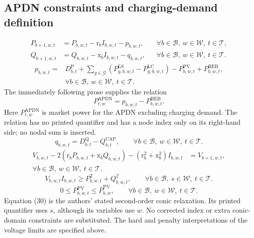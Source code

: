 \documentclass{article}
\begin{document}
\subsection*{APDN constraints and charging-demand definition}
\begin{align}
P_{b+1,w,t}&=P_{b,w,t}-\mathrm r_b I_{b,w,t}-p_{b,w,t},
&&\forall b\in\mathcal B,\ w\in\mathcal W,\ t\in\mathcal T,\tag{25}\\
Q_{b+1,w,t}&=Q_{b,w,t}-\mathrm x_b I_{b,w,t}-q_{b,w,t},
&&\forall b\in\mathcal B,\ w\in\mathcal W,\ t\in\mathcal T.\tag{26}
\end{align}
\begin{equation}
\begin{aligned}
p_{b,w,t}={}&D^{\mathrm P}_{b,t}
+\sum_{g\in\mathcal G}(P^{\mathrm{LS}}_{g,b,w,t}-P^{\mathrm{LC}}_{g,b,w,t})
-P^{\mathrm{PV}}_{b,w,t}+P^{\mathrm{BEB}}_{b,w,t},\\
&\forall b\in\mathcal B,\ w\in\mathcal W,\ t\in\mathcal T.
\end{aligned}\tag{27}
\end{equation}
The immediately following prose supplies the relation
\[
P^{\mathrm{APDN}}_{t,w}=p_{b,w,t}-P^{\mathrm{BEB}}_{b,w,t}.
\]
Here \(P^{\mathrm{APDN}}_{t,w}\) is market power for the APDN excluding charging demand. The relation has no printed quantifier and has a node index only on its right-hand side; no nodal sum is inserted.
\begin{equation}
q_{b,w,t}=D^{\mathrm Q}_{b,t}-Q^{\mathrm{CAP}}_{b,t},
\qquad\forall b\in\mathcal B,\ w\in\mathcal W,\ t\in\mathcal T.
\tag{28}
\end{equation}
\begin{equation}
\begin{aligned}
V_{b,w,t}-2(\mathrm r_bP_{b,w,t}+\mathrm x_bQ_{b,w,t})
-(\mathrm r_b^2+\mathrm x_b^2)I_{b,w,t}&=V_{b+1,w,t},\\
\forall b\in\mathcal B,\ w\in\mathcal W,\ t\in\mathcal T.&
\end{aligned}\tag{29}
\end{equation}
\begin{equation}
V_{b,w,t}I_{b,w,t}\geq P_{b,w,t}^2+Q_{b,w,t}^2,
\qquad\forall b\in\mathcal B,\ s\in\mathcal W,\ t\in\mathcal T.
\tag{30}
\end{equation}
\begin{equation}
0\leq P^{\mathrm{PV}}_{b,w,t}\leq\overline P^{\mathrm{PV}}_{b,w},
\qquad\forall b\in\mathcal B,\ w\in\mathcal W,\ t\in\mathcal T.
\tag{32}
\end{equation}
Equation (30) is the authors' stated second-order conic relaxation. Its printed quantifier uses \(s\), although its variables use \(w\). No corrected index or extra conic-domain constraints are substituted. The hard and penalty interpretations of the voltage limits are specified above.
\end{document}
